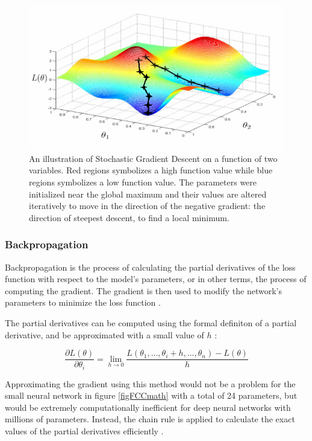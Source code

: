 \documentclass[a4paper, twoside]{article}
\newcommand*{\pd}[2]{\ensuremath{\dfrac{\partial #1}{\partial #2}}}
\begin{document}
\begin{figure}[h]
	\centering
  		\includegraphics[scale=1]{gradient-descent.png}
  	\caption{An illustration \cite{figSGD} of Stochastic Gradient Descent on a function of two variables. Red regions symbolizes a high function value while blue regions symbolizes a low function value. The parameters were initialized near the global maximum and their values are altered iteratively to move in the direction of the negative gradient: the direction of steepest descent, to find a local minimum.} \label{figSGD}
\end{figure}

\subsubsection{Backpropagation}
Backpropagation is the process of calculating the partial derivatives of the loss function with respect to the model's parameters, or in other terms, the process of computing the gradient. The gradient is then used to modify the network's parameters to minimize the loss function \cite{wikiStanford} \cite{gradient}.

The partial derivatives can be computed using the formal definiton of a partial derivative, and be approximated with a small value of $h$ \cite{wikiStanford} \cite{gradient}:

\begin{equation}\label{EQderivativeDefinition}
\pd{L(\theta)}{\theta_{i}} = \lim_{h \to 0} \frac{L(\theta_{1},...,\theta_{i} + h, ..., \theta_{n})-L(\theta)}{h}
\end{equation}

Approximating the gradient using this method would not be a problem for the small neural network in figure \ref{figFCCmath} with a total of 24 parameters, but would be extremely computationally inefficient for deep neural networks with millions of parameters. Instead, the chain rule is applied to calculate the exact values of the partial derivatives efficiently \cite{cs231n}.
\end{document}
